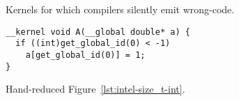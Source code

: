 \lstset{language=[OpenCL]C}
\begin{figure}
	\centering %
	\\%
	\\%
	\caption{Kernels for which compilers silently emit wrong-code.}%
\label{lst:compiler-crashes}%
\end{figure}


\begin{figure}
\begin{lstlisting}
__kernel void A(__global double* a) {
  if ((int)get_global_id(0) < -1)
    a[get_global_id(0)] = 1;
}
\end{lstlisting}
\label{lst:intel-size_t-int-reduced}
\caption{Hand-reduced Figure~\ref{lst:intel-size_t-int}.}
\end{figure}